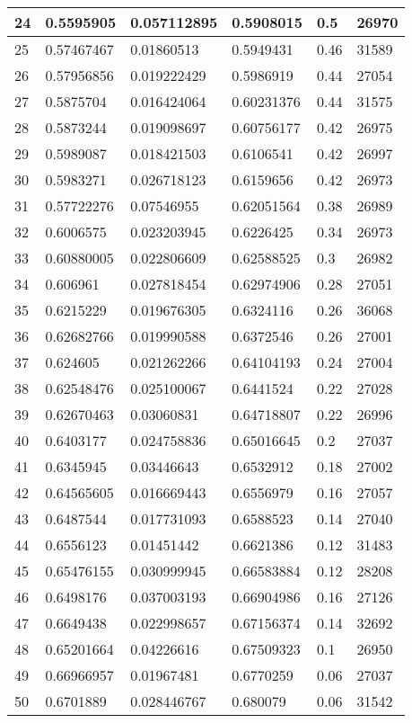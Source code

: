 \begin{longtable}{|l|l|l|l|l|l|}
24 & 0.5595905 & 0.057112895 & 0.5908015 & 0.5 & 26970 \\ \hline 
25 & 0.57467467 & 0.01860513 & 0.5949431 & 0.46 & 31589 \\ \hline 
26 & 0.57956856 & 0.019222429 & 0.5986919 & 0.44 & 27054 \\ \hline 
27 & 0.5875704 & 0.016424064 & 0.60231376 & 0.44 & 31575 \\ \hline 
28 & 0.5873244 & 0.019098697 & 0.60756177 & 0.42 & 26975 \\ \hline 
29 & 0.5989087 & 0.018421503 & 0.6106541 & 0.42 & 26997 \\ \hline 
30 & 0.5983271 & 0.026718123 & 0.6159656 & 0.42 & 26973 \\ \hline 
31 & 0.57722276 & 0.07546955 & 0.62051564 & 0.38 & 26989 \\ \hline 
32 & 0.6006575 & 0.023203945 & 0.6226425 & 0.34 & 26973 \\ \hline 
33 & 0.60880005 & 0.022806609 & 0.62588525 & 0.3 & 26982 \\ \hline 
34 & 0.606961 & 0.027818454 & 0.62974906 & 0.28 & 27051 \\ \hline 
35 & 0.6215229 & 0.019676305 & 0.6324116 & 0.26 & 36068 \\ \hline 
36 & 0.62682766 & 0.019990588 & 0.6372546 & 0.26 & 27001 \\ \hline 
37 & 0.624605 & 0.021262266 & 0.64104193 & 0.24 & 27004 \\ \hline 
38 & 0.62548476 & 0.025100067 & 0.6441524 & 0.22 & 27028 \\ \hline 
39 & 0.62670463 & 0.03060831 & 0.64718807 & 0.22 & 26996 \\ \hline 
40 & 0.6403177 & 0.024758836 & 0.65016645 & 0.2 & 27037 \\ \hline 
41 & 0.6345945 & 0.03446643 & 0.6532912 & 0.18 & 27002 \\ \hline 
42 & 0.64565605 & 0.016669443 & 0.6556979 & 0.16 & 27057 \\ \hline 
43 & 0.6487544 & 0.017731093 & 0.6588523 & 0.14 & 27040 \\ \hline 
44 & 0.6556123 & 0.01451442 & 0.6621386 & 0.12 & 31483 \\ \hline 
45 & 0.65476155 & 0.030999945 & 0.66583884 & 0.12 & 28208 \\ \hline 
46 & 0.6498176 & 0.037003193 & 0.66904986 & 0.16 & 27126 \\ \hline 
47 & 0.6649438 & 0.022998657 & 0.67156374 & 0.14 & 32692 \\ \hline 
48 & 0.65201664 & 0.04226616 & 0.67509323 & 0.1 & 26950 \\ \hline 
49 & 0.66966957 & 0.01967481 & 0.6770259 & 0.06 & 27037 \\ \hline 
50 & 0.6701889 & 0.028446767 & 0.680079 & 0.06 & 31542 \\ \hline 
\end{longtable}